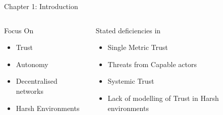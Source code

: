 \documentclass[aspectratio=169]{beamer}
\begin{document}
\begin{frame}{Chapter 1: Introduction}

  \begin{columns}
    \begin{column}{0.5\textwidth}
      \begin{block}{Focus On}
        \begin{itemize}
          \item Trust
          \item Autonomy
          \item Decentralised networks
          \item Harsh Environments
        \end{itemize}
      \end{block}
    \end{column}
    \begin{column}{0.5\textwidth}
      \begin{alertblock}{Stated deficiencies in}
        \begin{itemize}
          \item Single Metric Trust
          \item Threats from Capable actors
          \item Systemic Trust
          \item Lack of modelling of Trust in Harsh environments
        \end{itemize}
      \end{alertblock}
    \end{column}
  \end{columns}
\end{frame}
\end{document}
